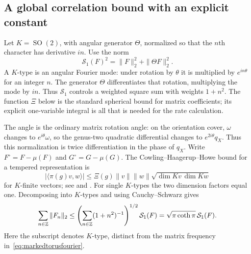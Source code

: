 \subsection{A global correlation bound with an explicit constant}

Let $K=\operatorname{SO}(2)$, with angular generator $\Theta$,
normalized so that the $n$th character has derivative $in$.
Use the norm
\begin{equation}
 \mathcal S_1(F)^2=\|F\|_2^2+\|\Theta F\|_2^2.
 \label{eq:markedtorusKnorm}
\end{equation}
A $K$-type is an angular Fourier mode: under rotation by
$\theta$ it is multiplied by $e^{in\theta}$ for an integer $n$.
The generator $\Theta$ differentiates that rotation, multiplying
the mode by $in$. Thus $\mathcal S_1$ controls a weighted square
sum with weights $1+n^2$. The function $\Xi$ below is the
standard spherical bound for matrix coefficients; its explicit
one-variable integral is all that is needed for the rate calculation.

The angle is the ordinary matrix rotation angle: on the orientation
cover, $\omega$ changes to $e^{i\theta}\omega$, so the genus-two
quadratic differential changes to $e^{2i\theta}q_X$. Thus this
normalization is twice differentiation in the phase of $q_X$.
Write $F^\circ=F-\mu(F)$ and $G^\circ=G-\mu(G)$.
The Cowling--Haagerup--Howe bound for a tempered representation is
\[
 |\langle\pi(g)v,w\rangle|
 \leq\Xi(g)\|v\|\|w\|
       \sqrt{\dim Kv\,\dim Kw}
\]
for $K$-finite vectors; see
\cite[Proposition 2.6]{BenoistKobayashi} and
\cite{CowlingHaagerupHowe}. For single $K$-types the two
dimension factors equal one. Decomposing into $K$-types and
using Cauchy--Schwarz gives
\[
 \sum_{n\in\mathbb Z}\|F_n\|_2
 \leq\left(\sum_{n\in\mathbb Z}(1+n^2)^{-1}\right)^{1/2}
       \mathcal S_1(F)
 =\sqrt{\pi\coth\pi}\,\mathcal S_1(F).
\]
Here the subscript denotes $K$-type, distinct from the matrix
frequency in~\eqref{eq:markedtorusfourier}.

